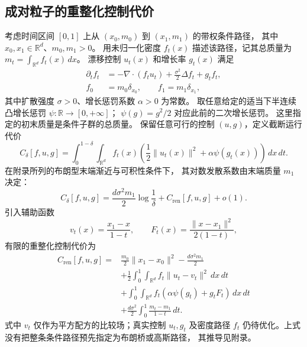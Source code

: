 \documentclass[UTF8,a4paper,11pt,fontset=fandol]{ctexart}
\begin{document}
\subsection*{成对粒子的重整化控制代价}
考虑时间区间 $[0,1]$ 上从 $(x_0,m_0)$ 到 $(x_1,m_1)$ 的带权条件路径，
其中 $x_0,x_1\in\mathbb R^d$、$m_0,m_1>0$。
用未归一化密度 $f_t(x)$ 描述该路径，记其总质量为
$m_t=\int_{\mathbb R^d}f_t(x)\,dx$。
漂移控制 $u_t(x)$ 和增长率 $g_t(x)$ 满足
\begin{equation}
\begin{aligned}
\partial_t f_t
&=-\nabla\cdot(f_tu_t)+\frac{\sigma^2}{2}\Delta f_t+g_tf_t,\\
f_0&=m_0\delta_{x_0},\qquad f_1=m_1\delta_{x_1},
\end{aligned}
\label{eq:pair-dynamics}
\end{equation}
其中扩散强度 $\sigma>0$、增长惩罚系数 $\alpha>0$ 为常数。
取任意给定的适当下半连续凸增长惩罚
$\psi:\mathbb R\to[0,+\infty]$；
$\psi(g)=g^2/2$ 对应此前的二次增长惩罚。
这里指定的初末质量是条件子群的总质量。
保留任意可行的控制 $(u,g)$，定义截断运行代价
\begin{equation}
C_\delta[f,u,g]
=\int_0^{1-\delta}\int_{\mathbb R^d}
f_t(x)\left(\frac12\|u_t(x)\|^2+\alpha\psi(g_t(x))\right)\,dx\,dt.
\label{eq:truncated-cost}
\end{equation}
在附录所列的布朗型末端渐近与可积性条件下，
其对数发散系数由末端质量 $m_1$ 决定：
\begin{equation}
C_\delta[f,u,g]
=\frac{d\sigma^2m_1}{2}\log\frac1\delta
+C_{\mathrm{ren}}[f,u,g]+o(1).
\label{eq:renormalization}
\end{equation}
引入辅助函数
\begin{equation}
v_t(x)=\frac{x_1-x}{1-t},
\qquad
F_t(x)=\frac{\|x-x_1\|^2}{2(1-t)},
\label{eq:comparison-fields}
\end{equation}
有限的重整化控制代价为
\begin{equation}
\boxed{
\begin{aligned}
C_{\mathrm{ren}}[f,u,g]
={}&\frac{m_0}{2}\|x_1-x_0\|^2-\frac{d\sigma^2m_1}{2}\\
&+\frac12\int_0^1\int_{\mathbb R^d}
f_t\|u_t-v_t\|^2\,dx\,dt\\
&+\int_0^1\int_{\mathbb R^d}
f_t\left(\alpha\psi(g_t)+g_tF_t\right)\,dx\,dt\\
&+\frac{d\sigma^2}{2}\int_0^1\frac{m_t-m_1}{1-t}\,dt.
\end{aligned}
}
\label{eq:renormalized-cost}
\end{equation}
式中 $v_t$ 仅作为平方配方的比较场；真实控制 $u_t,g_t$ 及密度路径 $f_t$
仍待优化。上式没有把整条条件路径预先指定为布朗桥或高斯路径，
其推导见附录。
\end{document}

